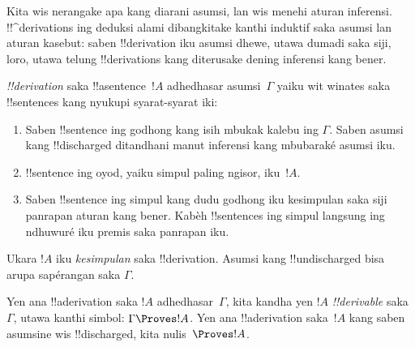 \documentclass[../../../include/open-logic-section]{subfiles}
\begin{document}
      {}
      {}


\begin{explain}
Kita wis nerangake apa kang diarani asumsi, lan wis menehi aturan
inferensi. !!^{derivation}s ing deduksi alami dibangkitake kanthi
induktif saka asumsi lan aturan kasebut: saben !!{derivation} iku
asumsi dhewe, utawa dumadi saka siji, loro, utawa telung
!!{derivation}s kang diterusake dening inferensi kang bener.
\end{explain}

\begin{defn}[!!^{derivation}]
 \emph{!!{derivation}} saka !!a{sentence}~$!A$
adhedhasar asumsi~$\Gamma$ yaiku wit winates saka !!{sentence}s kang
nyukupi syarat-syarat iki:
\begin{enumerate}
\item Saben !!{sentence} ing godhong kang isih mbukak kalebu ing $\Gamma$.
  Saben asumsi kang !!{discharged} ditandhani manut inferensi kang
  mbubaraké asumsi iku.
\item !!{sentence} ing oyod, yaiku simpul paling ngisor, iku~$!A$.
\item Saben !!{sentence} ing simpul kang dudu godhong iku kesimpulan
  saka siji panrapan aturan kang bener. Kabèh !!{sentence}s ing
  simpul langsung ing ndhuwuré iku premis saka panrapan iku.
\end{enumerate}
Ukara $!A$ iku \emph{kesimpulan} saka !!{derivation}. Asumsi kang
!!{undischarged} bisa arupa sapérangan saka $\Gamma$.

Yen ana !!a{derivation} saka $!A$ adhedhasar~$\Gamma$, kita kandha yen
$!A$ \emph{!!{derivable}} saka~$\Gamma$, utawa kanthi simbol:
$\Gamma \Proves !A$. Yen ana !!a{derivation} saka~$!A$ kang saben
asumsine wis !!{discharged}, kita nulis~$\Proves !A$.
\end{defn}
\end{document}
